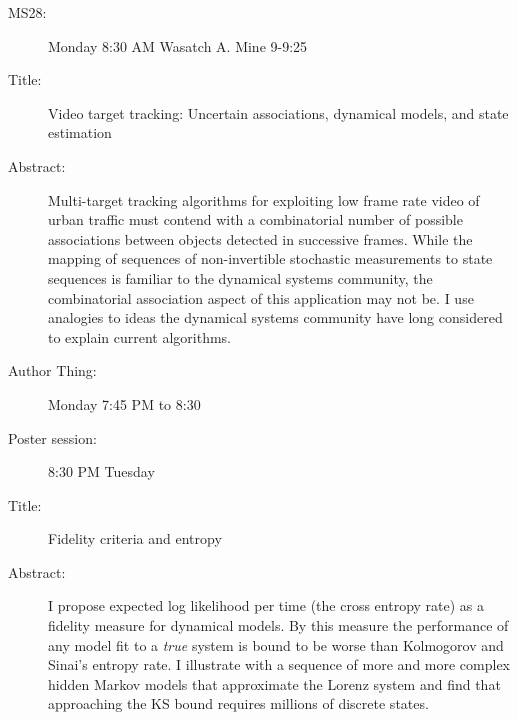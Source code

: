 \documentclass{article}
\begin{document}
\begin{description}
\item[MS28:] Monday 8:30 AM Wasatch A.  Mine 9-9:25
\item[Title:] Video target tracking: Uncertain associations, dynamical
  models, and state estimation
\item[Abstract:] %
  Multi-target tracking algorithms for exploiting low frame rate video
  of urban traffic must contend with a combinatorial number of
  possible associations between objects detected in successive frames.
  While the mapping of sequences of non-invertible stochastic
  measurements to state sequences is familiar to the dynamical systems
  community, the combinatorial association aspect of this application
  may not be.  I use analogies to ideas the dynamical systems
  community have long considered to explain current algorithms.
\item[Author Thing:] Monday 7:45 PM to 8:30
\item[Poster session:]  8:30 PM Tuesday
\item[Title:] Fidelity criteria and entropy
\item[Abstract:] %
  I propose expected log likelihood per time (the cross entropy rate)
  as a fidelity measure for dynamical models.  By this measure the
  performance of any model fit to a \emph{true} system is bound to be
  worse than Kolmogorov and Sinai's entropy rate.  I illustrate with a
  sequence of more and more complex hidden Markov models that
  approximate the Lorenz system and find that approaching the KS bound
  requires millions of discrete states.
\end{description}
\end{document}
